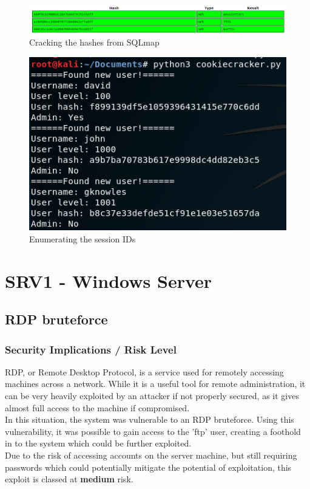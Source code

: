 \documentclass{report}
\begin{document}
\begin{figure}[!htb]
	\centering
	\includegraphics[scale=0.5]{img/crackstation.png}
	\caption{Cracking the hashes from SQLmap}
\end{figure}
\begin{figure}[!htb]
	\centering
	\includegraphics[scale=0.6]{img/cookie1.png}
	\caption{Enumerating the session IDs}
\end{figure}

\section{SRV1 - Windows Server}
\subsection{RDP bruteforce}
\subsubsection{Security Implications / Risk Level}
RDP, or Remote Desktop Protocol, is a service used for remotely accessing machines across a network. While it is a useful tool for remote administration, it can be very heavily exploited by an attacker if not properly secured, as it gives almost full access to the machine if compromised. \\
In this situation, the system was vulnerable to an RDP bruteforce. Using this vulnerability, it was possible to gain access to the 'ftp' user, creating a foothold in to the system which could be further exploited.\\
Due to the risk of accessing accounts on the server machine, but still requiring passwords which could potentially mitigate the potential of exploitation, this exploit is classed at \textbf{medium} risk.
\end{document}
